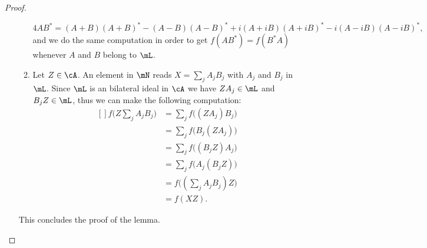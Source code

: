 \begin{proof}
\begin{enumerate}
\begin{enumerate}
\begin{equation}
                        4AB^*=(A+B)(A+B)^*-(A-B)(A-B)^*+i(A+iB)(A+iB)^*-i(A-iB)(A-iB)^*,
                    \end{equation}
                    and we do the same computation in order to get $f(AB^*)=f(B^*A)$ whenever $A$ and $B$ belong to $\mL$.
                \item
                    Let $Z\in\cA$. An element in $\mN$ reads $X=\sum_jA_jB_j$ with $A_j$ and $B_j$ in $\mL$. Since $\mL$ is an bilateral ideal in $\cA$ we have $ZA_j\in\mL$ and $B_jZ\in\mL$, thus we can make the following computation:
                    \begin{equation}
                        \begin{aligned}[]
                            f\big( Z\sum_jA_jB_j \big)&=\sum_jf\big( (ZA_j)B_j \big)\\
                            &=\sum_jf\big( B_j(ZA_j) \big)\\
                            &=\sum_jf\big( (B_jZ)A_j \big)\\
                            &=\sum_jf\big( A_j(B_jZ) \big)\\
                            &=f\big( (\sum_jA_jB_j)Z \big)\\
                            &=f(XZ).
                        \end{aligned}
                    \end{equation}              
            \end{enumerate}
            This concludes the proof of the lemma.
    \end{enumerate}
    
    
\end{proof}
